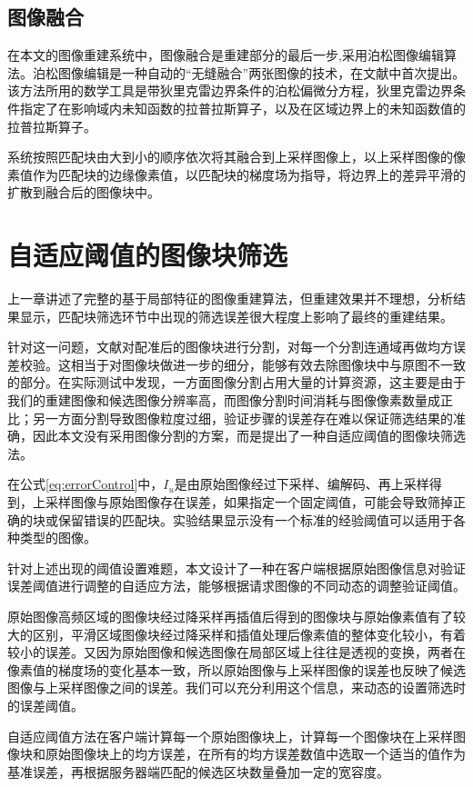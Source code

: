 \documentclass[UTF8]{csoarticle}
\begin{document}
\subsection{图像融合}
在本文的图像重建系统中，图像融合是重建部分的最后一步,采用泊松图像编辑算法。泊松图像编辑是一种自动的“无缝融合”两张图像的技术，在文献\cite{Perez:2003ul}中首次提出。该方法所用的数学工具是带狄里克雷边界条件的泊松偏微分方程，狄里克雷边界条件指定了在影响域内未知函数的拉普拉斯算子，以及在区域边界上的未知函数值的拉普拉斯算子。

系统按照匹配块由大到小的顺序依次将其融合到上采样图像上，以上采样图像的像素值作为匹配块的边缘像素值，以匹配块的梯度场为指导，将边界上的差异平滑的扩散到融合后的图像块中。

\section{自适应阈值的图像块筛选}

上一章讲述了完整的基于局部特征的图像重建算法，但重建效果并不理想，分析结果显示，匹配块筛选环节中出现的筛选误差很大程度上影响了最终的重建结果。

针对这一问题，文献\cite{Dai:2012vn}对配准后的图像块进行分割，对每一个分割连通域再做均方误差校验。这相当于对图像块做进一步的细分，能够有效去除图像块中与原图不一致的部分。在实际测试中发现，一方面图像分割占用大量的计算资源，这主要是由于我们的重建图像和候选图像分辨率高，而图像分割时间消耗与图像像素数量成正比；另一方面分割导致图像粒度过细，验证步骤的误差存在难以保证筛选结果的准确，因此本文没有采用图像分割的方案，而是提出了一种自适应阈值的图像块筛选法。

在公式\ref{eq:errorControl}中，\(I_u\)是由原始图像经过下采样、编解码、再上采样得到，上采样图像与原始图像存在误差，如果指定一个固定阈值，可能会导致筛掉正确的块或保留错误的匹配块。实验结果显示没有一个标准的经验阈值可以适用于各种类型的图像。

针对上述出现的阈值设置难题，本文设计了一种在客户端根据原始图像信息对验证误差阈值进行调整的自适应方法，能够根据请求图像的不同动态的调整验证阈值。

原始图像高频区域的图像块经过降采样再插值后得到的图像块与原始像素值有了较大的区别，平滑区域图像块经过降采样和插值处理后像素值的整体变化较小，有着较小的误差。又因为原始图像和候选图像在局部区域上往往是透视的变换，两者在像素值的梯度场的变化基本一致，所以原始图像与上采样图像的误差也反映了候选图像与上采样图像之间的误差。我们可以充分利用这个信息，来动态的设置筛选时的误差阈值。

自适应阈值方法在客户端计算每一个原始图像块上，计算每一个图像块在上采样图像块和原始图像块上的均方误差，在所有的均方误差数值中选取一个适当的值作为基准误差，再根据服务器端匹配的候选区块数量叠加一定的宽容度。
\end{document}
